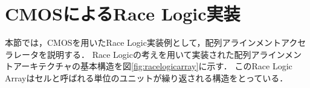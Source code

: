 \section{CMOSによるRace Logic実装}
本節では，CMOSを用いたRace Logic実装例として，配列アラインメントアクセラレータを説明する．
Race Logicの考えを用いて実装された配列アラインメントアーキテクチャの基本構造を図\ref{fig:racelogicarray}に示す．
このRace Logic Arrayはセルと呼ばれる単位のユニットが繰り返される構造をとっている．
\begin{figure}[t!]
\begin{center}

\end{center}
\end{figure}
